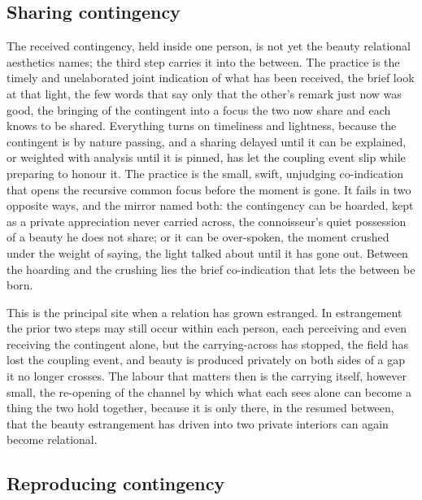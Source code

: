 \subsection{Sharing contingency}
\label{p22:sub:we-sharing}

The received contingency, held inside one person, is not yet the beauty relational aesthetics names; the third step carries it into the between. The practice is the timely and unelaborated joint indication of what has been received, the brief look at that light, the few words that say only that the other's remark just now was good, the bringing of the contingent into a focus the two now share and each knows to be shared. Everything turns on timeliness and lightness, because the contingent is by nature passing, and a sharing delayed until it can be explained, or weighted with analysis until it is pinned, has let the coupling event slip while preparing to honour it. The practice is the small, swift, unjudging co-indication that opens the recursive common focus before the moment is gone. It fails in two opposite ways, and the mirror named both: the contingency can be hoarded, kept as a private appreciation never carried across, the connoisseur's quiet possession of a beauty he does not share; or it can be over-spoken, the moment crushed under the weight of saying, the light talked about until it has gone out. Between the hoarding and the crushing lies the brief co-indication that lets the between be born.

This is the principal site when a relation has grown estranged. In estrangement the prior two steps may still occur within each person, each perceiving and even receiving the contingent alone, but the carrying-across has stopped, the field has lost the coupling event, and beauty is produced privately on both sides of a gap it no longer crosses. The labour that matters then is the carrying itself, however small, the re-opening of the channel by which what each sees alone can become a thing the two hold together, because it is only there, in the resumed between, that the beauty estrangement has driven into two private interiors can again become relational.

\subsection{Reproducing contingency}
\label{p22:sub:we-reproducing}

